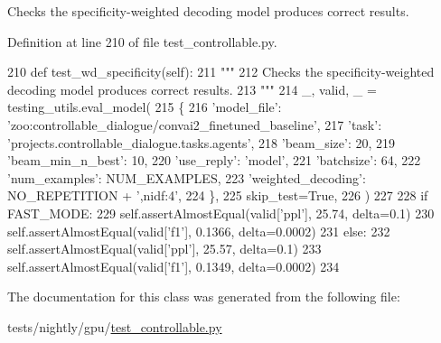\begin{DoxyVerb}Checks the specificity-weighted decoding model produces correct results.
\end{DoxyVerb}
 

Definition at line 210 of file test\+\_\+controllable.\+py.


\begin{DoxyCode}
210     \textcolor{keyword}{def }test\_wd\_specificity(self):
211         \textcolor{stringliteral}{"""}
212 \textcolor{stringliteral}{        Checks the specificity-weighted decoding model produces correct results.}
213 \textcolor{stringliteral}{        """}
214         \_, valid, \_ = testing\_utils.eval\_model(
215             \{
216                 \textcolor{stringliteral}{'model\_file'}: \textcolor{stringliteral}{'zoo:controllable\_dialogue/convai2\_finetuned\_baseline'},
217                 \textcolor{stringliteral}{'task'}: \textcolor{stringliteral}{'projects.controllable\_dialogue.tasks.agents'},
218                 \textcolor{stringliteral}{'beam\_size'}: 20,
219                 \textcolor{stringliteral}{'beam\_min\_n\_best'}: 10,
220                 \textcolor{stringliteral}{'use\_reply'}: \textcolor{stringliteral}{'model'},
221                 \textcolor{stringliteral}{'batchsize'}: 64,
222                 \textcolor{stringliteral}{'num\_examples'}: NUM\_EXAMPLES,
223                 \textcolor{stringliteral}{'weighted\_decoding'}: NO\_REPETITION + \textcolor{stringliteral}{',nidf:4'},
224             \},
225             skip\_test=\textcolor{keyword}{True},
226         )
227 
228         \textcolor{keywordflow}{if} FAST\_MODE:
229             self.assertAlmostEqual(valid[\textcolor{stringliteral}{'ppl'}], 25.74, delta=0.1)
230             self.assertAlmostEqual(valid[\textcolor{stringliteral}{'f1'}], 0.1366, delta=0.0002)
231         \textcolor{keywordflow}{else}:
232             self.assertAlmostEqual(valid[\textcolor{stringliteral}{'ppl'}], 25.57, delta=0.1)
233             self.assertAlmostEqual(valid[\textcolor{stringliteral}{'f1'}], 0.1349, delta=0.0002)
234 
\end{DoxyCode}


The documentation for this class was generated from the following file\+:\begin{DoxyCompactItemize}
\item 
tests/nightly/gpu/\hyperlink{test__controllable_8py}{test\+\_\+controllable.\+py}\end{DoxyCompactItemize}
